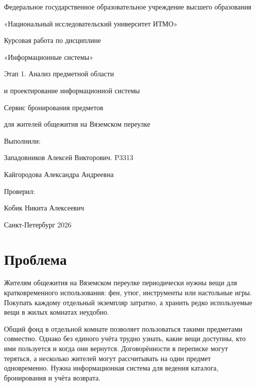 \documentclass[a4paper,12pt]{article}
\begin{document}
\begin{titlepage}
\thispagestyle{empty}
\begin{center}
Федеральное государственное образовательное учреждение высшего образования

«Национальный исследовательский университет ИТМО»

\vspace{3.8cm}
{\Large Курсовая работа по дисциплине}

{\Large «Информационные системы»}

\vspace{0.6cm}
{\Large Этап 1. Анализ предметной области\par и проектирование информационной системы}

\vspace{0.6cm}
{\large Сервис бронирования предметов\par для жителей общежития на Вяземском переулке}

\vfill
\begin{flushright}
Выполнили:

Западовников Алексей Викторович. P3313

Кайгородова Александра Андреевна

Проверил:

Кобик Никита Алексеевич
\end{flushright}
\vfill
Санкт-Петербург 2026
\end{center}
\end{titlepage}
\pagestyle{empty}
\tableofcontents
\clearpage
{}
\setcounter{page}{3}
\pagestyle{plain}

\section{Проблема}
Жителям общежития на Вяземском переулке периодически нужны вещи для кратковременного использования: фен, утюг, инструменты или настольные игры. Покупать каждому отдельный экземпляр затратно, а хранить редко используемые вещи в жилых комнатах неудобно.

Общий фонд в отдельной комнате позволяет пользоваться такими предметами совместно. Однако без единого учёта трудно узнать, какие вещи доступны, кто ими пользуется и когда они вернутся. Договорённости в переписке могут теряться, а несколько жителей могут рассчитывать на один предмет одновременно. Нужна информационная система для ведения каталога, бронирования и учёта возврата.
\end{document}
